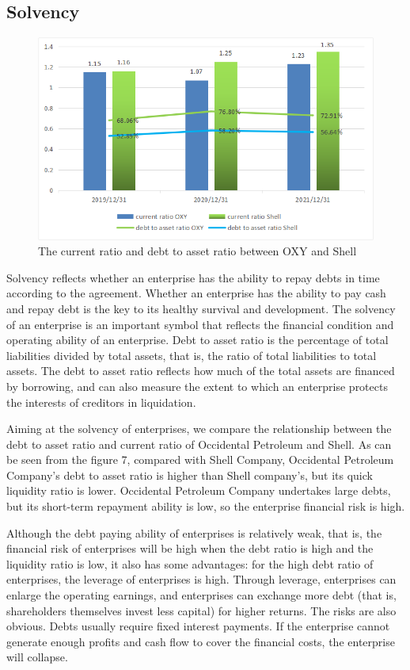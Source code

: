 \documentclass[
	a4paper, %
	12pt,%
]{CSSullivanBusinessReport}
\begin{document}
\begin{fullwidth}
\subsection{Solvency}
\begin{figure}
    \centering
    \includegraphics{Images/The current ratio and debt to asset ratio between OXY and Shell.png}
    \caption{The current ratio and debt to asset ratio between OXY and Shell}
    \label{The current ratio and debt to asset ratio between OXY and Shell}
\end{figure}
Solvency reflects whether an enterprise has the ability to repay debts in time according to the agreement. Whether an enterprise has the ability to pay cash and repay debt is the key to its healthy survival and development. The solvency of an enterprise is an important symbol that reflects the financial condition and operating ability of an enterprise. Debt to asset ratio is the percentage of total liabilities divided by total assets, that is, the ratio of total liabilities to total assets. The debt to asset ratio reflects how much of the total assets are financed by borrowing, and can also measure the extent to which an enterprise protects the interests of creditors in liquidation.
\par
Aiming at the solvency of enterprises, we compare the relationship between the debt to asset ratio and current ratio of Occidental Petroleum and Shell. As can be seen from the figure 7, compared with Shell Company, Occidental Petroleum Company's debt to asset ratio is higher than Shell company's, but its quick liquidity ratio is lower. Occidental Petroleum Company undertakes large debts, but its short-term repayment ability is low, so the enterprise financial risk is high. 
\par
Although the debt paying ability of enterprises is relatively weak, that is, the financial risk of enterprises will be high when the debt ratio is high and the liquidity ratio is low, it also has some advantages: for the high debt ratio of enterprises, the leverage of enterprises is high. Through leverage, enterprises can enlarge the operating earnings, and enterprises can exchange more debt (that is, shareholders themselves invest less capital) for higher returns. The risks are also obvious. Debts usually require fixed interest payments. If the enterprise cannot generate enough profits and cash flow to cover the financial costs, the enterprise will collapse.
\par


\end{fullwidth}
\end{document}
